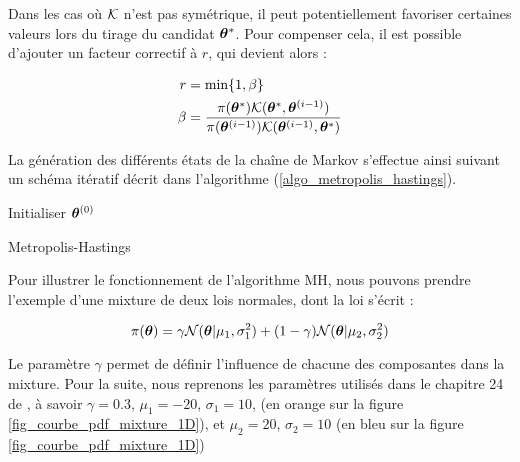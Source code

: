 Dans les cas où ${\mathcal{K}}$ n'est pas symétrique, il peut potentiellement favoriser certaines valeurs lors du tirage du candidat ${{\bm{\theta}}^*}$. Pour compenser cela, il est possible d'ajouter un facteur correctif à $r$, qui devient alors : 

\begin{equation}
 \label{eq_acceptation_MH}
\begin{split}
r & =\min\{1,\beta\} \\
\beta & =\dfrac{\pi({{\bm{\theta}}^*}){\mathcal{K}}({{\bm{\theta}}^*}, {{\bm{\theta}}^{(i-1)}})}{\pi({{\bm{\theta}}^{(i-1)}}){\mathcal{K}}({{\bm{\theta}}^{(i-1)}}, {{\bm{\theta}}^*})}
\end{split}
\end{equation}

La génération des différents états de la chaîne de Markov s'effectue ainsi suivant un schéma itératif décrit dans l'algorithme (\ref{algo_metropolis_hastings}). \\
\IncMargin{1em}
\begin{algorithm}
	\SetAlgoLined
	Initialiser ${\bm{\theta}}^{(0)}$\;
\caption{Metropolis-Hastings}
\label{algo_metropolis_hastings}
\end{algorithm}

Pour illustrer le fonctionnement de l'algorithme MH, nous pouvons prendre l'exemple d'une mixture de deux lois normales, dont la loi s'écrit : 

\begin{equation}
\pi({\bm{\theta}}) = \gamma \mathcal{N}({\bm{\theta}} | \mu_1, \sigma_1^2) + (1-\gamma)\mathcal{N}({\bm{\theta}} | \mu_2, \sigma_2^2)
\label{eq_mixture_2_gaussiennes_1D"}
\end{equation}

Le paramètre $\gamma$ permet de définir l'influence de chacune des composantes dans la mixture. Pour la suite, nous reprenons les paramètres utilisés dans le chapitre 24 de  \cite{Murphy2012}, à savoir $\gamma = 0.3$, $\mu_1 = -20$, $\sigma_1 = 10$,  (en orange sur la figure \ref{fig_courbe_pdf_mixture_1D}), et $\mu_2 = 20$, $\sigma_2 = 10$ (en bleu sur la figure \ref{fig_courbe_pdf_mixture_1D})


